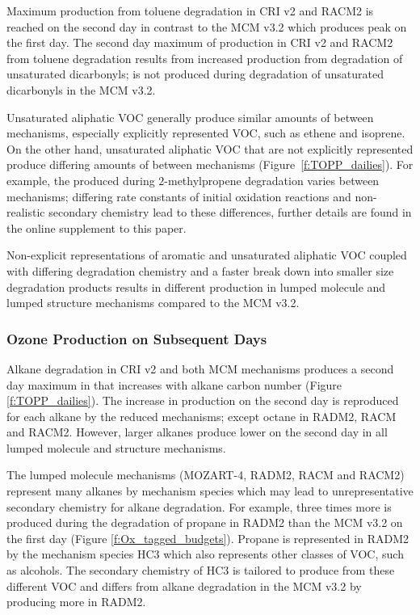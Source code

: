 Maximum  production from toluene degradation in CRI v2 and RACM2 is reached on the second day in contrast to the MCM v3.2 which produces peak  on the first day.
The second day maximum of  production in CRI v2 and RACM2 from toluene degradation results from increased  production from degradation of unsaturated dicarbonyls;  is not produced during degradation of unsaturated dicarbonyls in the MCM v3.2.

Unsaturated aliphatic VOC generally produce similar amounts of  between mechanisms, especially explicitly represented VOC, such as ethene and isoprene.
On the other hand, unsaturated aliphatic VOC that are not explicitly represented produce differing amounts of  between mechanisms \mbox{(Figure \ref{f:TOPP_dailies}).}
For example, the  produced during $2$-methylpropene degradation varies between mechanisms; differing rate constants of initial oxidation reactions and non-realistic secondary chemistry lead to these differences, further details are found in the online supplement to this paper.

Non-explicit representations of aromatic and unsaturated aliphatic VOC coupled with differing degradation chemistry and a faster break down into smaller size degradation products results in different  production in lumped molecule and lumped structure mechanisms compared to the MCM v3.2.
%
\subsubsection{Ozone Production on Subsequent Days} \label{sss:profiles} %
%
Alkane degradation in CRI v2 and both MCM mechanisms produces a second day maximum in  that increases with alkane carbon number (Figure \ref{f:TOPP_dailies}).
The increase in  production on the second day is reproduced for each alkane by the reduced mechanisms; except octane in RADM2, RACM and RACM2.
However, larger alkanes produce lower  on the second day in all lumped molecule and structure mechanisms.

The lumped molecule mechanisms (MOZART-4, RADM2, RACM and RACM2) represent many alkanes by mechanism species which may lead to unrepresentative secondary chemistry for alkane degradation.
For example, three times more  is produced during the degradation of propane in RADM2 than the MCM v3.2 on the first day (Figure \ref{f:Ox_tagged_budgets}).
Propane is represented in RADM2 by the mechanism species HC3 which also represents other classes of VOC, such as alcohols.
The secondary chemistry of HC3 is tailored to produce  from these different VOC and differs from alkane degradation in the MCM v3.2 by producing more  in RADM2.

